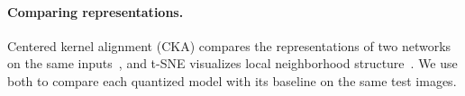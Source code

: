 \paragraph{Comparing representations.}
Centered kernel alignment (CKA) compares the representations of two networks on the same inputs~\cite{kornblith2019similarity}, and t-SNE visualizes local neighborhood structure~\cite{vandermaaten2008tsne}.
We use both to compare each quantized model with its baseline on the same test images.
